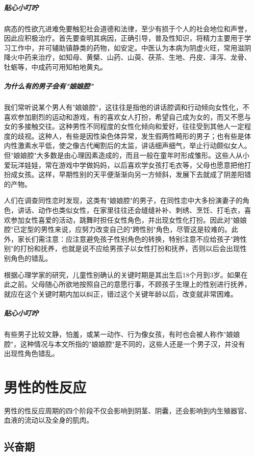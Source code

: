 \subparagraph{贴心小叮咛}

病态的性欲亢进难免要触犯社会道德和法律，至少有损于个人的社会地位和声誉，因此应积极治疗。首先要查明其病因，正确引导，普及性知识，将精力主要用于学习工作中，并可辅助镇静类的药物，如安定。中医认为本病为阴虚火旺，常用滋阴降火中药来治疗，如知母、黄檗、山药、山萸、茯茶、生地、丹皮、泽泻、龙骨、牡蛎等，中成药可用知柏地黄丸。

\subparagraph{为什么有的男子会有"娘娘腔"}

我们常听说某个男人有"娘娘腔"，这往往是指他的讲话腔调和行动倾向女性化，不喜欢参加剧烈的运动和游戏，有的喜欢女人打扮，希望自己成为女的，而又不愿与女的多接触交往。这种男性不同程度的女性化倾向和爱好，往往受到其他人一定程度的歧视。这种人，有些是因性染色体异常，发生假两性畸形的男子；也有些是体内性激素水平低，使之像古代阉割后的太监，讲话细声细气，举止行动颇似女人。但"娘娘腔"大多数是由心理因素造成的，而且一般在童年时形成雏形。这些人从小爱玩洋娃娃，常在游戏中学做妈妈，以后喜欢学女孩打毛衣等，父母也愿意把他打扮成女孩。这样，早期性别的天平便渐渐向另一方倾斜，发展下去就成了阴差阳错的产物。

人们在调查同性恋时发现，这类有"娘娘腔"的男子，在同性恋中大多扮演妻子的角色，讲话、动作也类似女性，在家里往往还会缝缝补补、刺绣、烹饪、打毛衣，喜欢参加女性喜爱的活动，跳舞时担任女性角色，并出现女性化打扮。因此对"娘娘腔"已定型的男性来说，应努力改变自己的"跨性别"角色，尽管这是较难的。此外，家长们需注意：应注意避免孩子性别角色的转换，特别注意不应给孩子"跨性别"的打扮和抚养，也就是说不应给男孩子以女性打扮和抚养，否则以后会出现性别角色的错乱。

根据心理学家的研究，儿童性别确认的关键时期是其出生后18个月到3岁。如果在此之前。父母随心所欲地按照自己的意愿行事，不顾孩子生理上的性别进行抚养，就应在这个关键时期内加以纠正，错过这个关键年龄以后，改变就非常困难。

\subparagraph{贴心小叮咛}

有些男子比较文静，怕羞，或某一动作、行为像女孩，有时也会被人称作"娘娘腔"，这种情况与本文所指的"娘娘腔"是不同的，这些人还是一个男子汉，并没有出现性角色错乱。

\section{男性的性反应}

男性的性反应周期的四个阶段不仅会影响到阴茎、阴囊，还会影响到内生殖器官、血液的流动以及全身的肌肉。

\subsection{兴奋期}

